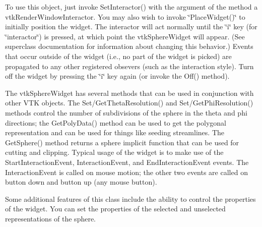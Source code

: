 To use this object, just invoke Set\-Interactor() with the argument of the method a vtk\-Render\-Window\-Interactor. You may also wish to invoke \char`\"{}\-Place\-Widget()\char`\"{} to initially position the widget. The interactor will act normally until the \char`\"{}i\char`\"{} key (for \char`\"{}interactor\char`\"{}) is pressed, at which point the vtk\-Sphere\-Widget will appear. (See superclass documentation for information about changing this behavior.) Events that occur outside of the widget (i.\-e., no part of the widget is picked) are propagated to any other registered obsevers (such as the interaction style). Turn off the widget by pressing the \char`\"{}i\char`\"{} key again (or invoke the Off() method).

The vtk\-Sphere\-Widget has several methods that can be used in conjunction with other V\-T\-K objects. The Set/\-Get\-Theta\-Resolution() and Set/\-Get\-Phi\-Resolution() methods control the number of subdivisions of the sphere in the theta and phi directions; the Get\-Poly\-Data() method can be used to get the polygonal representation and can be used for things like seeding streamlines. The Get\-Sphere() method returns a sphere implicit function that can be used for cutting and clipping. Typical usage of the widget is to make use of the Start\-Interaction\-Event, Interaction\-Event, and End\-Interaction\-Event events. The Interaction\-Event is called on mouse motion; the other two events are called on button down and button up (any mouse button).

Some additional features of this class include the ability to control the properties of the widget. You can set the properties of the selected and unselected representations of the sphere.

